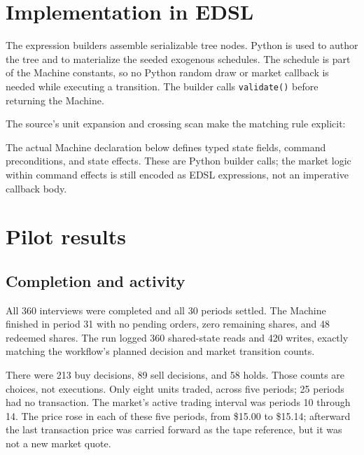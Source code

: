 \documentclass[11pt]{article}
\newcommand{\code}[1]{\texttt{\small #1}}
\begin{document}
\section{Implementation in EDSL}
The expression builders assemble serializable tree nodes. Python is used to
author the tree and to materialize the seeded exogenous schedules. The schedule
is part of the Machine constants, so no Python random draw or market callback
is needed while executing a transition. The builder calls \code{validate()}
before returning the Machine.

The source's unit expansion and crossing scan make the matching rule explicit:



The actual Machine declaration below defines typed state fields, command
preconditions, and state effects. These are Python builder calls; the market
logic within command effects is still encoded as EDSL expressions, not an
imperative callback body.





\section{Pilot results}
\subsection{Completion and activity}
All 360 interviews were completed and all 30 periods settled. The Machine
finished in period 31 with no pending orders, zero remaining shares, and 48
redeemed shares. The run logged 360 shared-state reads and 420 writes, exactly
matching the workflow's planned decision and market transition counts.

There were 213 buy decisions, 89 sell decisions, and 58 holds. Those counts
are choices, not executions. Only eight units traded, across five periods;
25 periods had no transaction. The market's active trading interval was
periods 10 through 14. The price rose in each of these five periods, from
\$15.00 to \$15.14; afterward the last transaction price was carried forward
as the tape reference, but it was not a new market quote.
\end{document}
